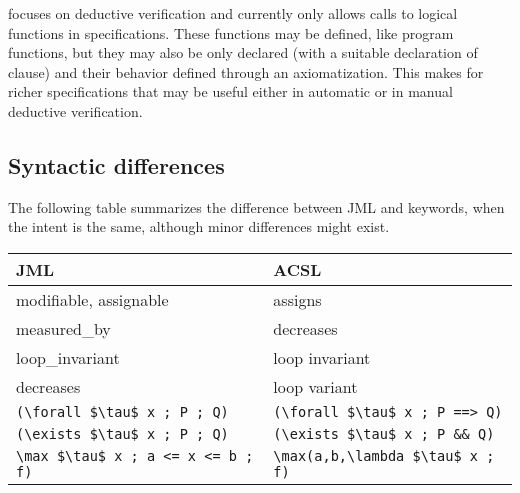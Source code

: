 \acsl focuses on deductive verification and currently only allows calls to logical functions in
specifications. These functions may be defined, like program functions, but
they may also be only declared (with a suitable declaration of \reads
clause) and their behavior defined through an axiomatization.
This makes for richer specifications that may be useful either in
automatic or in manual deductive verification.


\subsection{Syntactic differences}

The following table summarizes the difference between JML and \acsl keywords, when the intent is the same, although minor differences
might exist.
\begin{center}
\begin{tabular}{|l|l|}
\hline
  JML                  & ACSL \\ \hline
  modifiable, assignable           & assigns \\
  measured\_by         & decreases \\
  loop\_invariant      & loop invariant \\
  decreases            & loop variant \\
  \lstinline|(\forall $\tau$ x ; P ; Q)| &
       \lstinline|(\forall $\tau$ x ; P ==> Q)| \\
  \lstinline|(\exists $\tau$ x ; P ; Q)| &
        \lstinline|(\exists $\tau$ x ; P && Q)| \\
  \lstinline|\max $\tau$ x ; a <= x <= b ; f)| &
        \lstinline|\max(a,b,\lambda $\tau$ x ; f)| \\
  \hline
\end{tabular}
\end{center}

